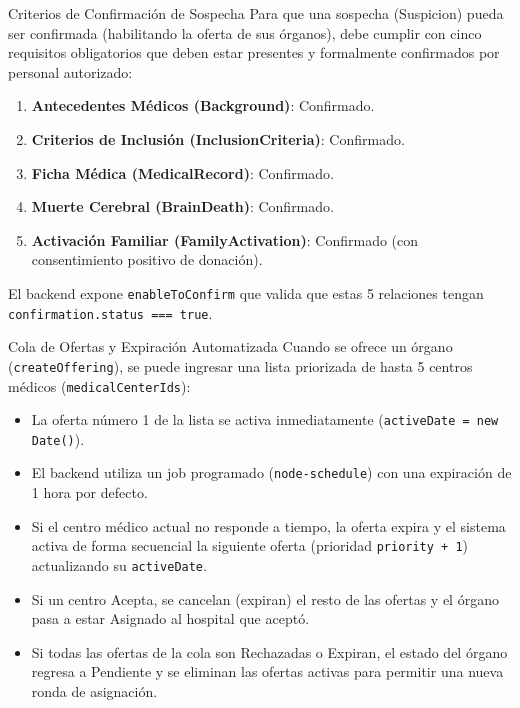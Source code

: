 \documentclass[11pt, a4paper]{article}
\begin{document}
\begin{reglabox}{Criterios de Confirmación de Sospecha}
Para que una sospecha (Suspicion) pueda ser confirmada (habilitando la oferta de sus órganos), debe cumplir con cinco requisitos obligatorios que deben estar presentes y formalmente confirmados por personal autorizado:
\begin{enumerate}
    \item \textbf{Antecedentes Médicos (Background)}: Confirmado.
    \item \textbf{Criterios de Inclusión (InclusionCriteria)}: Confirmado.
    \item \textbf{Ficha Médica (MedicalRecord)}: Confirmado.
    \item \textbf{Muerte Cerebral (BrainDeath)}: Confirmado.
    \item \textbf{Activación Familiar (FamilyActivation)}: Confirmado (con consentimiento positivo de donación).
\end{enumerate}
El backend expone \texttt{enableToConfirm} que valida que estas 5 relaciones tengan \texttt{confirmation.status === true}.
\end{reglabox}

\vspace{0.3cm}

\begin{reglabox}{Cola de Ofertas y Expiración Automatizada}
Cuando se ofrece un órgano (\texttt{createOffering}), se puede ingresar una lista priorizada de hasta 5 centros médicos (\texttt{medicalCenterIds}):
\begin{itemize}
    \item La oferta número 1 de la lista se activa inmediatamente (\texttt{activeDate = new Date()}).
    \item El backend utiliza un job programado (\texttt{node-schedule}) con una expiración de 1 hora por defecto.
    \item Si el centro médico actual no responde a tiempo, la oferta expira y el sistema activa de forma secuencial la siguiente oferta (prioridad \texttt{priority + 1}) actualizando su \texttt{activeDate}.
    \item Si un centro Acepta, se cancelan (expiran) el resto de las ofertas y el órgano pasa a estar Asignado al hospital que aceptó.
    \item Si todas las ofertas de la cola son Rechazadas o Expiran, el estado del órgano regresa a Pendiente y se eliminan las ofertas activas para permitir una nueva ronda de asignación.
\end{itemize}
\end{reglabox}
\end{document}
